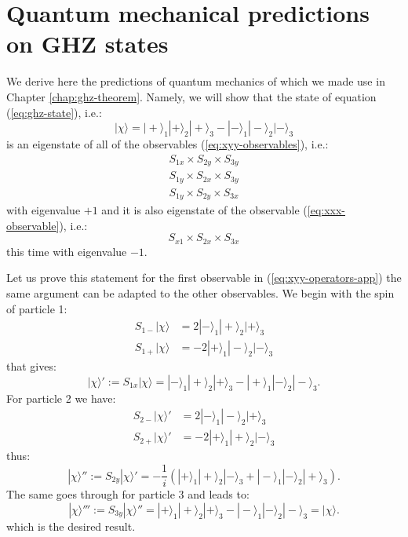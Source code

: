 \section{Quantum mechanical predictions on GHZ states}
We derive here the predictions of quantum mechanics of which we made use in Chapter \ref{chap:ghz-theorem}. Namely, we will show that the state of equation (\ref{eq:ghz-state}), i.e.:
\begin{equation*}
  |\chi\rangle = |+\rangle_1 |+\rangle_2 |+\rangle_3 - |-\rangle_1 |-\rangle_2 |-\rangle_3
\end{equation*}
is an eigenstate of all of the observables (\ref{eq:xyy-observables}), i.e.:
\begin{equation}
  \begin{split}
    S_{1x} \times S_{2y} \times S_{3y}\\
    S_{1y} \times S_{2x} \times S_{3y}\\
    S_{1y} \times S_{2y} \times S_{3x}
  \end{split}
  \label{eq:xyy-operators-app}
\end{equation}
with eigenvalue $+ 1$ and it is also eigenstate of the observable (\ref{eq:xxx-observable}), i.e.:
\begin{equation*}
  S_{x1} \times S_{2x} \times S_{3x}
\end{equation*}
this time with eigenvalue $- 1$.

Let us prove this statement for the first observable in (\ref{eq:xyy-operators-app}) the same argument can be adapted to the other observables. We begin with the spin of particle 1:
\begin{equation*}
  \begin{split}
    S_{1-} |\chi\rangle &= 2 |-\rangle_1 |+\rangle_2 |+\rangle_3\\
    S_{1+} |\chi\rangle &= - 2 |+\rangle_1 |-\rangle_2 |-\rangle_3
  \end{split}
\end{equation*}
that gives:
\begin{equation*}
  |\chi\rangle' := S_{1x} |\chi\rangle = |-\rangle_1 |+\rangle_2 |+\rangle_3 - |+\rangle_1 |-\rangle_2 |-\rangle_3.
\end{equation*}
For particle 2 we have:
\begin{equation*}
  \begin{split}
    S_{2-} |\chi\rangle' &= 2 |-\rangle_1 |-\rangle_2 |+\rangle_3\\
    S_{2+} |\chi\rangle' &= - 2 |+\rangle_1 |+\rangle_2 |-\rangle_3
  \end{split}
\end{equation*}
thus:
\begin{equation*}
  |\chi\rangle'' := S_{2y} |\chi\rangle' = - \frac{1}{i} \left( |+\rangle_1 |+\rangle_2 |-\rangle_3 + |-\rangle_1 |-\rangle_2 |+\rangle_3 \right).
\end{equation*}
The same goes through for particle 3 and leads to:
\begin{equation*}
  |\chi\rangle''' := S_{3y} |\chi\rangle'' = |+\rangle_1 |+\rangle_2 |+\rangle_3 - |-\rangle_1 |-\rangle_2 |-\rangle_3 = |\chi\rangle.
\end{equation*}
which is the desired result.
